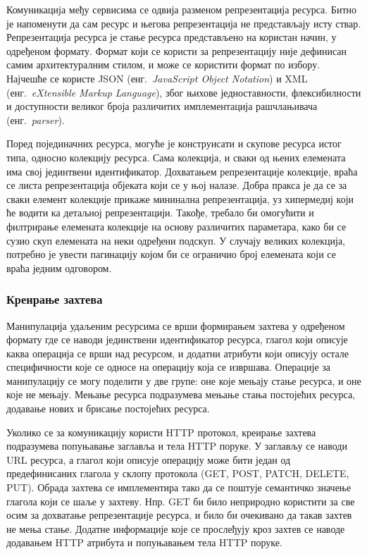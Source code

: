 \documentclass[12pt,oneside]{memoir}
\begin{document}
Комуникација међу сервисима се одвија разменом репрезентација ресурса. Битно је напоменути да сам ресурс и његова репрезентација не представљају исту ствар. Репрезентација ресурса је стање ресурса представљено на користан начин, у одређеном формату. Формат који се користи за репрезентацију није дефинисан самим архитектуралним стилом, и може се користити формат по избору. Најчешће се користе JSON (енг.~\textit{JavaScript Object Notation}) и XML (енг.~\textit{eXtensible Markup Language}), због њихове једноставности, флексибилности и доступности великог броја различитих имплементација рашчлањивача (енг.~\textit{parser}).

Поред појединачних ресурса, могуће је конструисати и скупове ресурса истог типа, односно колекцију ресурса. Сама колекција, и сваки од њених елемената има свој јединтвени идентификатор. Дохватањем репрезентације колекције, враћа се листа репрезентација објеката који се у њој налазе. Добра пракса је да се за сваки елемент колекције прикаже мининална репрезентација, уз хипермедиј који ће водити ка детаљној репрезентацији. Такође, требало би омогућити и филтрирање елемената колекције на основу различитих параметара, како би се сузио скуп елемената на неки одређени подскуп. У случају великих колекција, потребно је увести пагинацију којом би се ограничио број елемената који се враћа једним одговором.   

\subsubsection{Креирање захтева}
Манипулација удаљеним ресурсима се врши формирањем захтева у одређеном формату где се наводи јединствени идентификатор ресурса, глагол који описује каква операција се врши над ресурсом, и додатни атрибути који описују остале специфичности које се односе на операцију која се извршава. Операције за манипулацију се могу поделити у две групе: оне које мењају стање ресурса, и оне које не мењају. Мењање ресурса подразумева мењање стања постојећих ресурса, додавање нових и брисање постојећих ресурса.

Уколико се за комуникацију користи HTTP протокол, креирање захтева подразумева попуњавање заглавља и тела HTTP поруке. У заглављу се наводи URL ресурса, а глагол који описује операцију може бити један од предефинисаних глагола у склопу протокола (GET, POST, PATCH, DELETE, PUT). Обрада захтева се имплементира тако да се поштује семантичко значење глагола који се шаље у захтеву. Нпр. GET би било неприродно користити за све осим за дохватање репрезентације ресурса, и било би очекивано да такав захтев не мења стање. Додатне информације које се прослеђују кроз захтев се наводе додавањем HTTP атрибута и попуњавањем тела HTTP поруке.
\end{document}
